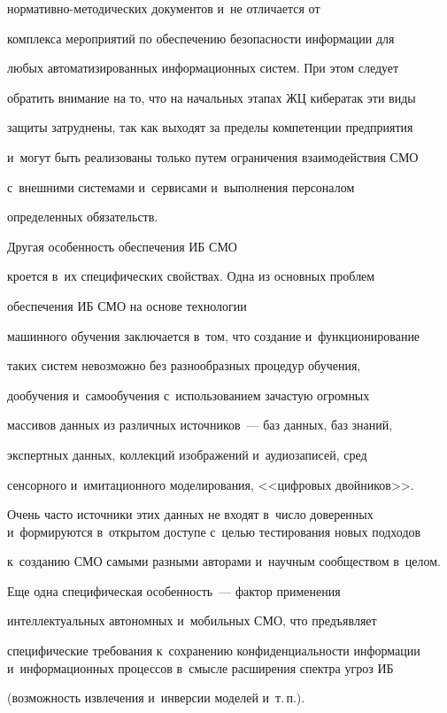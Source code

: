 нор\-ма\-тив\-но-ме\-то\-ди\-че\-ских документов и~не отличается от 

комплекса мероприятий по обеспечению безопас\-ности информации для 

любых автоматизированных информационных сис\-тем. При этом следует 

обратить внимание на то, что на начальных этапах ЖЦ кибератак эти виды 

защиты затруднены, так как выходят за пределы компетенции предприятия 

и~могут быть реализованы только путем ограничения взаимодействия СМО 

с~внешними системами и~сервисами и~выполнения персоналом 

определенных обязательств.


     Другая особенность обеспечения ИБ СМО 

кроется в~их специфических свойствах. Одна из основных проб\-лем 

обеспечения ИБ СМО на основе технологии 

машинного обучения заключается в~том, что создание и~функционирование 

таких систем невозможно без разнообразных процедур обучения, 

до\-обуче\-ния и~са\-мо\-обуче\-ния с~использованием зачастую огромных 

массивов данных из различных источников~--- баз данных, баз знаний, 

экспертных данных, коллекций изображений и~аудиозаписей, сред 

сенсорного и~имитационного моделирования, <<цифровых двойников>>. 

Очень часто источники этих данных не входят в~число доверенных и~формируются в~открытом доступе с~целью тестирования новых подходов 

к~созданию СМО самыми разными авторами и~научным сообществом в~целом. 

     

     Еще одна специфическая особенность~--- фактор применения 

интеллектуальных автономных и~мобильных СМО, что предъявляет 

специфические требования к~сохранению конфиденциальности информации и~информационных процессов в~смысле расширения спектра угроз ИБ 

(возможность извлечения и~инверсии моделей и~т.\,п.).

